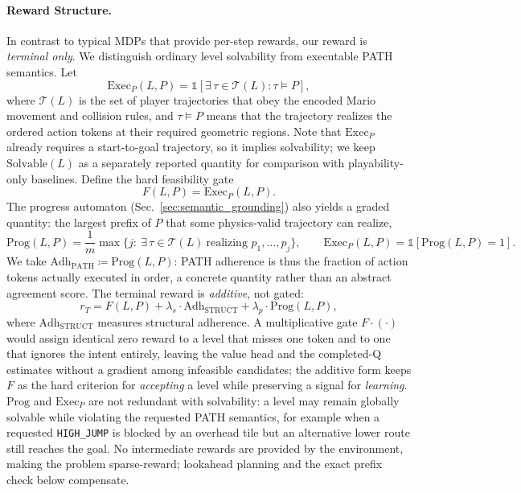 \documentclass[11pt,a4paper]{article}
\begin{document}
\paragraph{Reward Structure.}
In contrast to typical MDPs that provide per-step rewards, our reward is \emph{terminal only}. We distinguish ordinary level solvability from executable PATH semantics. Let
\begin{equation}
\mathrm{Exec}_{P}(L,P)
=\mathbb{1}\!\left[\exists\,\tau\in\mathcal{T}(L):\tau\models P\right],
\label{eq:path_exec}
\end{equation}
where \(\mathcal{T}(L)\) is the set of player trajectories that obey the encoded Mario movement and collision rules, and \(\tau\models P\) means that the trajectory realizes the ordered action tokens at their required geometric regions. Note that \(\mathrm{Exec}_{P}\) already requires a start-to-goal trajectory, so it implies solvability; we keep \(\mathrm{Solvable}(L)\) as a separately reported quantity for comparison with playability-only baselines. Define the hard feasibility gate
\begin{equation}
F(L,P)=\mathrm{Exec}_{P}(L,P).
\label{eq:joint_feasibility}
\end{equation}
The progress automaton (Sec.~\ref{sec:semantic_grounding}) also yields a graded quantity: the largest prefix of \(P\) that some physics-valid trajectory can realize,
\begin{equation}
\mathrm{Prog}(L,P)=\frac{1}{m}\max\bigl\{j:\ \exists\,\tau\in\mathcal{T}(L)\ \text{realizing }p_1,\ldots,p_j\bigr\},
\qquad \mathrm{Exec}_{P}(L,P)=\mathbb{1}[\mathrm{Prog}(L,P)=1].
\label{eq:path_progress}
\end{equation}
We take \(\mathrm{Adh}_{\mathrm{PATH}}\coloneqq\mathrm{Prog}(L,P)\): PATH adherence is thus the fraction of action tokens actually executed in order, a concrete quantity rather than an abstract agreement score. The terminal reward is \emph{additive}, not gated:
\begin{equation}
    r_T = F(L,P) + \lambda_s \cdot \mathrm{Adh}_{\mathrm{STRUCT}} + \lambda_p \cdot \mathrm{Prog}(L,P),
    \label{eq:terminal_reward}
\end{equation}
where \(\mathrm{Adh}_{\mathrm{STRUCT}}\) measures structural adherence. A multiplicative gate \(F\cdot(\cdot)\) would assign identical zero reward to a level that misses one token and to one that ignores the intent entirely, leaving the value head and the completed-Q estimates without a gradient among infeasible candidates; the additive form keeps \(F\) as the hard criterion for \emph{accepting} a level while preserving a signal for \emph{learning}. \(\mathrm{Prog}\) and \(\mathrm{Exec}_{P}\) are not redundant with solvability: a level may remain globally solvable while violating the requested PATH semantics, for example when a requested \texttt{HIGH\_JUMP} is blocked by an overhead tile but an alternative lower route still reaches the goal. No intermediate rewards are provided by the environment, making the problem sparse-reward; lookahead planning and the exact prefix check below compensate.
\end{document}
